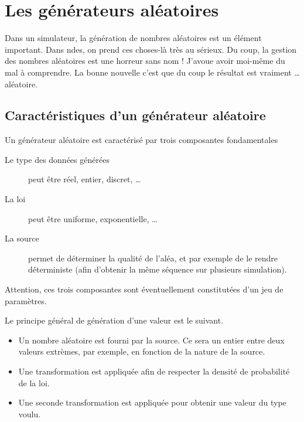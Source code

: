 %
\section{Les générateurs aléatoires}
\label{section:rand-gen}

   Dans un simulateur, la génération de nombres aléatoires est un
élément important. Dans {\sc ndes}, on prend ces choses-là très au
sérieux. Du coup, la gestion des nombres aléatoires est une horreur
sans nom ! J'avoue avoir moi-même du mal à comprendre. La bonne
nouvelle c'est que du coup le résultat est vraiment \ldots{}
aléatoire.

%
\subsection{Caractéristiques d'un générateur aléatoire}

   Un générateur aléatoire est caractérisé par trois composantes
fondamentales 

\begin{description}
   \item[Le type des données générées] peut être réel, entier,
     discret, \ldots
   \item[La loi] peut être uniforme, exponentielle, \ldots
   \item[La source] permet de déterminer la qualité de l'aléa, et par
     exemple de le rendre déterministe (afin d'obtenir la même
     séquence sur plusieurs simulation).
\end{description}

   Attention, ces trois composantes sont éventuellement constitutées
d'un jeu de paramètres.

   Le principe général de génération d'une valeur est le suivant.

\begin{itemize}
   \item Un nombre aléatoire est fourni par la source. Ce sera un
     entier entre deux valeurs extrèmes, par exemple, en fonction de
     la nature de la source.
   \item Une transformation est appliquée afin de respecter la
     densité de probabilité de la loi.
   \item Une seconde transformation est appliquée pour obtenir une
     valeur du type voulu.
\end{itemize}

